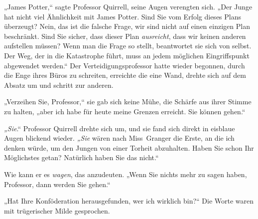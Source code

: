 „James Potter,“ sagte Professor Quirrell, seine Augen verengten sich. „Der Junge hat nicht viel Ähnlichkeit mit James Potter. Sind Sie vom Erfolg dieses Plans überzeugt? Nein, das ist die falsche Frage, wir sind nicht auf einen einzigen Plan beschränkt. Sind Sie sicher, dass dieser Plan \emph{ausreicht}, dass wir keinen anderen aufstellen müssen? Wenn man die Frage so stellt, beantwortet sie sich von selbst. Der Weg, der in die Katastrophe führt, muss an jedem möglichen Eingriffspunkt abgewendet werden.“
Der Verteidigungsprofessor hatte wieder begonnen, durch die Enge ihres Büros zu schreiten, erreichte die eine Wand, drehte sich auf dem Absatz um und schritt zur anderen.

„Verzeihen Sie, Professor,“ sie gab sich keine Mühe, die Schärfe aus ihrer Stimme zu halten, „aber ich habe für heute meine Grenzen erreicht. Sie können gehen.“

\emph{„Sie}.“ Professor Quirrell drehte sich um, und sie fand sich direkt in eisblaue Augen blickend wieder. \emph{„Sie} wären nach Miss~Granger die Erste, an die ich denken würde, um den Jungen von einer Torheit abzuhalten. Haben Sie schon Ihr Möglichstes getan? Natürlich haben Sie das nicht.“

Wie kann er es \emph{wagen}, das anzudeuten.
„Wenn Sie nichts mehr zu sagen haben, Professor, dann werden Sie gehen.“

„Hat Ihre Konföderation herausgefunden, wer ich wirklich bin?“
Die Worte waren mit trügerischer Milde gesprochen.

